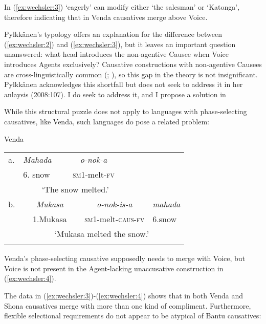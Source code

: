 \documentclass[output=paper]{langscibook}
\begin{document}
In (\ref{ex:wechsler:3}) ‘eagerly’ can modify either ‘the salesman’ or ‘Katonga’, therefore indicating that in Venda causatives merge above Voice.  



Pylkkänen’s typology offers an explanation for the difference between (\ref{ex:wechsler:2}) and (\ref{ex:wechsler:3}), but it leaves an important question unanswered: what head introduces the non-agentive Causee when Voice introduces Agents exclusively? Causative constructions with non-agentive Causees are cross-linguistically common (\citealt{Kulikov2001}; \citealt{Kittilä2013}), so this gap in the theory is not insignificant. Pylkkänen acknowledges this shortfall but does not seek to address it in her anlaysis (2008:107). I do seek to address it, and I propose a solution in   



While this structural puzzle does not apply to languages with phase-selecting causatives, like Venda, such languages do pose a related problem:


\ea\label{ex:wechsler:4}
Venda \citet[2]{Pylkkänen2008}\\

\tablefirsthead{}

\tabletail{}
\tablelasttail{}
\begin{tabularx}{\textwidth}{XXXXXX}
\lsptoprule
a. & {\itshape Mahada} & \multicolumn{2}{c}{\textit{o-nok-a}} & \multicolumn{2}{c}{}\\
& 6. snow & \multicolumn{2}{c}{\textsc{sm1}{}-melt-\textsc{fv} } & \multicolumn{2}{c}{}\\
& \multicolumn{3}{c}{‘The snow melted.’} & \multicolumn{2}{c}{}\\
b. & \multicolumn{2}{c}{{\itshape Mukasa}} & \multicolumn{2}{c}{{\itshape o-nok-is-a} } & {\itshape mahada}\\
& \multicolumn{2}{c}{1.Mukasa}  & \multicolumn{2}{c}{\textsc{sm1}{}-melt-\textsc{caus}{}-\textsc{fv} } & 6.snow\\
& \multicolumn{5}{c}{‘Mukasa melted the snow.’}\\
\lspbottomrule
\end{tabularx}
\z

Venda’s phase-selecting causative supposedly needs to merge with Voice, but Voice is not present in the Agent-lacking unaccusative construction in (\ref{ex:wechsler:4}).

The data in (\ref{ex:wechsler:3})-(\ref{ex:wechsler:4}) shows that in both Venda and Shona causatives merge with more than one kind of compliment. Furthermore, flexible selectional requirements do not appear to be atypical of Bantu causatives: 
\end{document}
